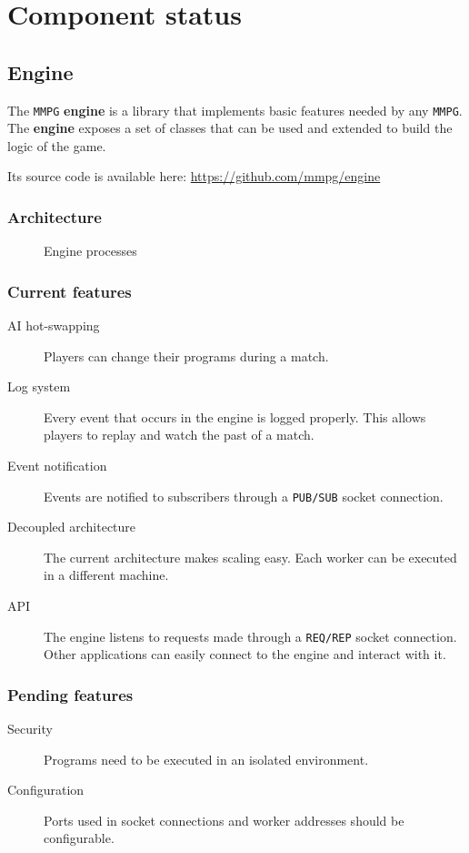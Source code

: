 \documentclass[a4paper,11pt]{article}
\begin{document}
\section{Component status}
\label{components}
\subsection{Engine}
The \texttt{MMPG} \textbf{engine} is a library that implements basic features needed by any \texttt{MMPG}. The \textbf{engine} exposes a set
of classes that can be used and extended to build the logic of the game.

Its source code is available here: \url{https://github.com/mmpg/engine}
\subsubsection{Architecture}
\begin{figure}[!h]
\noindent\resizebox{\textwidth}{!}{

}
\caption{Engine processes}
\label{engine_arch}
\end{figure}
\subsubsection{Current features}
\begin{description}
\item[AI hot-swapping]
Players can change their programs during a match.
\item[Log system]
Every event that occurs in the engine is logged properly. This allows players to replay and
  watch the past of a match.
\item[Event notification]
Events are notified to subscribers through a \texttt{PUB/SUB} socket connection.
\item[Decoupled architecture]
The current architecture makes scaling easy. Each worker can be executed in a
  different machine.
\item[API]
The engine listens to requests made through a \texttt{REQ/REP} socket connection. Other applications can easily
  connect to the engine and interact with it.
\end{description}
\subsubsection{Pending features}
\begin{description}
\item[Security]
Programs need to be executed in an isolated environment.
\item[Configuration]
Ports used in socket connections and worker addresses should be configurable.
\end{description}
\end{document}
